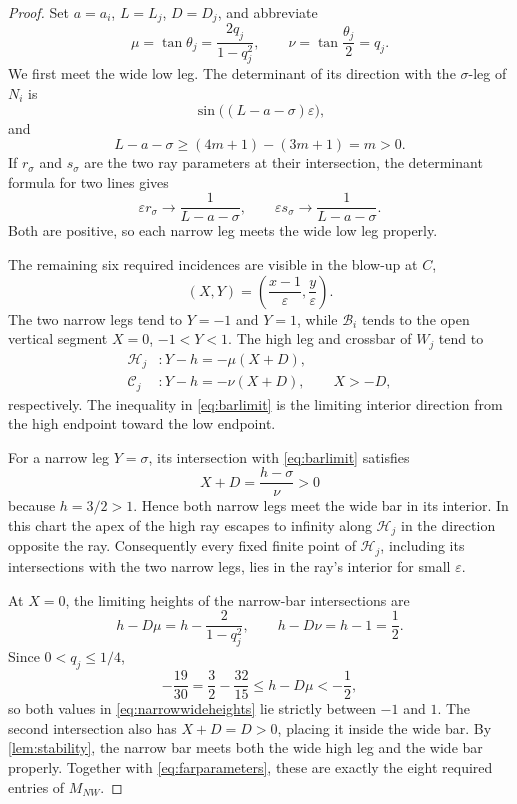 \documentclass[11pt]{amsart}
\theoremstyle{definition}
\newcommand{\B}{\mathcal B}
\newcommand{\eps}{\varepsilon}
\begin{document}
\begin{proof}
Set $a=a_i$, $L=L_j$, $D=D_j$, and abbreviate
\begin{equation}\label{eq:muv}
 \mu=\tan\theta_j=\frac{2q_j}{1-q_j^2},
 \qquad
 \nu=\tan\frac{\theta_j}{2}=q_j.
\end{equation}
We first meet the wide low leg.  The determinant of its direction with the
$\sigma$-leg of $N_i$ is
\[
 \sin\bigl((L-a-\sigma)\eps\bigr),
\]
and
\[
 L-a-\sigma\ge(4m+1)-(3m+1)=m>0.
\]
If $r_\sigma$ and $s_\sigma$ are the two ray parameters at their
intersection, the determinant formula for two lines gives
\begin{equation}\label{eq:farparameters}
 \eps r_\sigma\longrightarrow\frac1{L-a-\sigma},
 \qquad
 \eps s_\sigma\longrightarrow\frac1{L-a-\sigma}.
\end{equation}
Both are positive, so each narrow leg meets the wide low leg properly.

The remaining six required incidences are visible in the blow-up at $C$,
\[
 (X,Y)=\left(\frac{x-1}{\eps},\frac y\eps\right).
\]
The two narrow legs tend to $Y=-1$ and $Y=1$, while $\B_i$ tends to the open
vertical segment $X=0$, $-1<Y<1$.  The high leg and crossbar of $W_j$ tend
to
\begin{align}
 \mathcal H_j&:Y-h=-\mu(X+D),\label{eq:highlimit}\\
 \mathcal C_j&:Y-h=-\nu(X+D),\qquad X>-D,\label{eq:barlimit}
\end{align}
respectively.  The inequality in \eqref{eq:barlimit} is the limiting
interior direction from the high endpoint toward the low endpoint.

For a narrow leg $Y=\sigma$, its intersection with \eqref{eq:barlimit}
satisfies
\[
 X+D=\frac{h-\sigma}{\nu}>0
\]
because $h=3/2>1$.  Hence both narrow legs meet the wide bar in its
interior.  In this chart the apex of the high ray escapes to infinity along
$\mathcal H_j$ in the direction opposite the ray.  Consequently every fixed
finite point of $\mathcal H_j$, including its intersections with the two
narrow legs, lies in the ray's interior for small $\eps$.

At $X=0$, the limiting heights of the narrow-bar intersections are
\begin{equation}\label{eq:narrowwideheights}
 h-D\mu=h-\frac{2}{1-q_j^2},
 \qquad
 h-D\nu=h-1=\frac12.
\end{equation}
Since $0<q_j\le1/4$,
\[
 -\frac{19}{30}
 =\frac32-\frac{32}{15}
 \le h-D\mu< -\frac12,
\]
so both values in \eqref{eq:narrowwideheights} lie strictly between $-1$
and $1$.  The second intersection also has $X+D=D>0$, placing it inside the
wide bar.  By \cref{lem:stability}, the narrow bar meets both the wide high
leg and the wide bar properly.  Together with \eqref{eq:farparameters},
these are exactly the eight required entries of $M_{NW}$.
\end{proof}
\end{document}
